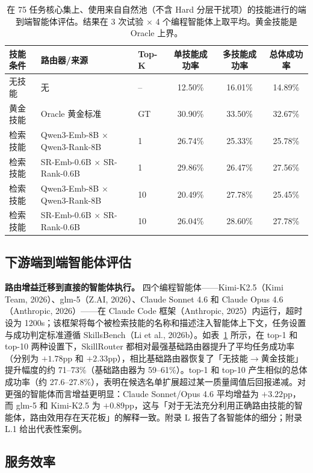 \documentclass[11pt,UTF8,fontset=fandol]{ctexart}
\begin{document}
\begin{table}[H]\centering
\caption{在 75 任务核心集上、使用来自自然池（不含 Hard 分层干扰项）的技能进行的端到端智能体评估。结果在 3 次试验 $\times$ 4 个编程智能体上取平均。黄金技能是 Oracle 上界。}
\small
\begin{tabular}{lllccc}
\toprule
技能条件 & 路由器/来源 & Top-K & 单技能成功率 & 多技能成功率 & 总体成功率 \\ \midrule
无技能 & 无 & -- & 12.50\% & 16.01\% & 14.89\% \\
黄金技能 & Oracle 黄金标准 & GT & 30.90\% & 33.50\% & 32.67\% \\
检索技能 & Qwen3-Emb-8B $\times$ Qwen3-Rank-8B & 1 & 26.74\% & 25.33\% & 25.78\% \\
检索技能 & SR-Emb-0.6B $\times$ SR-Rank-0.6B & 1 & 29.86\% & 26.47\% & 27.56\% \\
检索技能 & Qwen3-Emb-8B $\times$ Qwen3-Rank-8B & 10 & 20.49\% & 27.78\% & 25.45\% \\
检索技能 & SR-Emb-0.6B $\times$ SR-Rank-0.6B & 10 & 26.04\% & 28.60\% & 27.78\% \\
\bottomrule
\end{tabular}
\label{tab:6}
\end{table}

\subsection{下游端到端智能体评估}

\textbf{路由增益迁移到直接的智能体执行。} 四个编程智能体——Kimi-K2.5（Kimi Team, 2026）、glm-5（Z.AI, 2026）、Claude Sonnet 4.6 和 Claude Opus 4.6（Anthropic, 2026）——在 Claude Code 框架（Anthropic, 2025）内运行，超时设为 1200s；该框架将每个被检索技能的名称和描述注入智能体上下文，任务设置与成功判定标准遵循 SkillsBench（Li et al., 2026b）。如表~\ref{tab:6} 所示，在 top-1 和 top-10 两种设置下，SkillRouter 都相对最强基础路由器提升了平均任务成功率（分别为 $+1.78$pp 和 $+2.33$pp），相比基础路由器恢复了「无技能$\rightarrow$黄金技能」提升幅度的约 71--73\%（基础路由器为 59--61\%）。top-1 和 top-10 产生相似的总体成功率（约 27.6--27.8\%），表明在候选名单扩展超过某一质量阈值后回报递减。对更强的智能体而言增益更明显：Claude Sonnet/Opus 4.6 平均增益为 $+3.22$pp，而 glm-5 和 Kimi-K2.5 为 $+0.89$pp，这与「对于无法充分利用正确路由技能的智能体，路由效用存在天花板」的解释一致。附录 L 报告了各智能体的细分；附录 L.1 给出代表性案例。

\subsection{服务效率}
\end{document}
